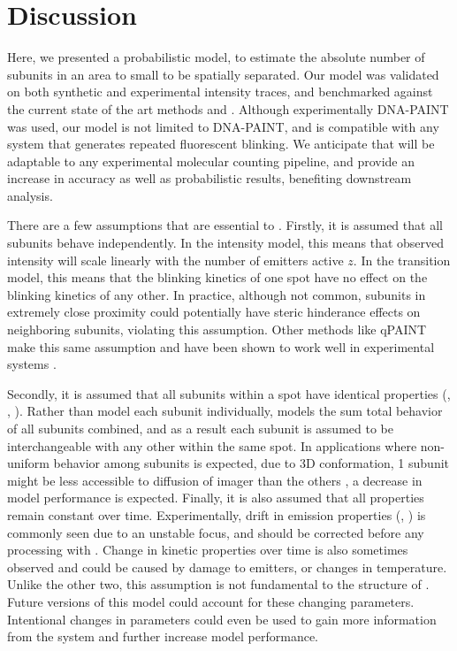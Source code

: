 \section{Discussion}
Here, we presented \ours a probabilistic model, to estimate the absolute 
number of subunits in an area to small to be spatially separated. 
    Our model was validated on both synthetic and experimental intensity traces,
    and benchmarked against the current state of the art methods \lbfcs \cite{stein_2021} and \qpaint \cite{jungmann_2016}.
    Although experimentally DNA-PAINT was used, our model is not 
    limited to DNA-PAINT, and is compatible with any system that generates repeated fluorescent blinking.
    We anticipate that \ours will be adaptable to any experimental molecular counting pipeline,
    and provide an increase in accuracy as well as probabilistic results, benefiting downstream analysis.

There are a few assumptions that are essential to \ours.
    Firstly, it is assumed that all subunits behave independently.
    In the intensity model, this means that observed intensity will scale linearly with the number of emitters active $z$.
    In the transition model, this means that the blinking kinetics of one spot have no effect on the blinking kinetics of any other.
    In practice, although not common, subunits in extremely close proximity could potentially 
    have steric hinderance effects on neighboring subunits, violating this assumption.
    Other methods like qPAINT make this same assumption and have been shown to work well in experimental 
    systems \cite{fischer_quantitative_2021, jayasinghe_true_2018}. 
    
Secondly, it is assumed that all subunits within a spot have identical properties (\pon, \poff, \re).
    Rather than model each subunit individually, \ours models the sum total behavior of all subunits combined, 
    and as a result each subunit is assumed to be interchangeable with any other within the same spot.
    In applications where non-uniform behavior among subunits is expected, \eg due to 3D conformation, 
    1 subunit might be less accessible to diffusion of imager than the others \cite{civitci_2020}, a decrease in model performance is expected.
    Finally, it is also assumed that all properties remain constant over time. 
    Experimentally, drift in emission properties (\re, \rb) is commonly seen due to an unstable focus, and should be corrected before any processing with \ours.
    Change in kinetic properties over time is also sometimes observed and could be caused by damage to emitters, or changes in temperature. 
    Unlike the other two, this assumption is not fundamental to the structure of \ours. 
    Future versions of this model could account for these changing parameters.
    Intentional changes in parameters could even be used to gain more information from the system and further increase model performance. 
    

